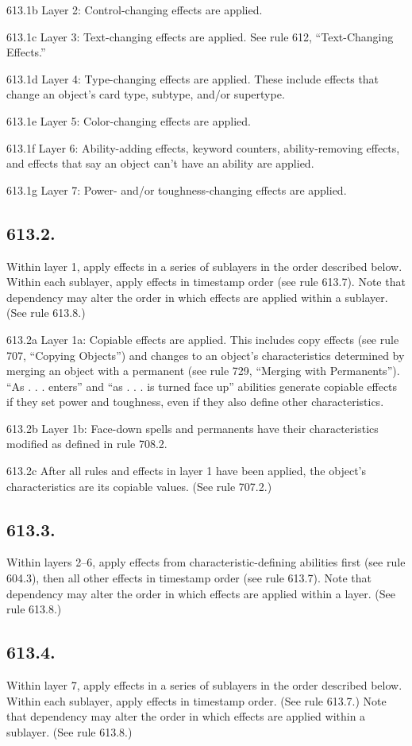 613.1b Layer 2: Control-changing effects are applied.

613.1c Layer 3: Text-changing effects are applied. See rule 612, “Text-Changing Effects.”

613.1d Layer 4: Type-changing effects are applied. These include effects that change an object’s card type, subtype, and/or supertype.

613.1e Layer 5: Color-changing effects are applied.

613.1f Layer 6: Ability-adding effects, keyword counters, ability-removing effects, and effects that say an object can’t have an ability are applied.

613.1g Layer 7: Power- and/or toughness-changing effects are applied.

\subsection*{613.2.}
Within layer 1, apply effects in a series of sublayers in the order described below. Within each sublayer, apply effects in timestamp order (see rule 613.7). Note that dependency may alter the order in which effects are applied within a sublayer. (See rule 613.8.)

613.2a Layer 1a: Copiable effects are applied. This includes copy effects (see rule 707, “Copying Objects”) and changes to an object’s characteristics determined by merging an object with a permanent (see rule 729, “Merging with Permanents”). “As . . . enters” and “as . . . is turned face up” abilities generate copiable effects if they set power and toughness, even if they also define other characteristics.

613.2b Layer 1b: Face-down spells and permanents have their characteristics modified as defined in rule 708.2.

613.2c After all rules and effects in layer 1 have been applied, the object’s characteristics are its copiable values. (See rule 707.2.)

\subsection*{613.3.}
Within layers 2–6, apply effects from characteristic-defining abilities first (see rule 604.3), then all other effects in timestamp order (see rule 613.7). Note that dependency may alter the order in which effects are applied within a layer. (See rule 613.8.)

\subsection*{613.4.}
Within layer 7, apply effects in a series of sublayers in the order described below. Within each sublayer, apply effects in timestamp order. (See rule 613.7.) Note that dependency may alter the order in which effects are applied within a sublayer. (See rule 613.8.)

